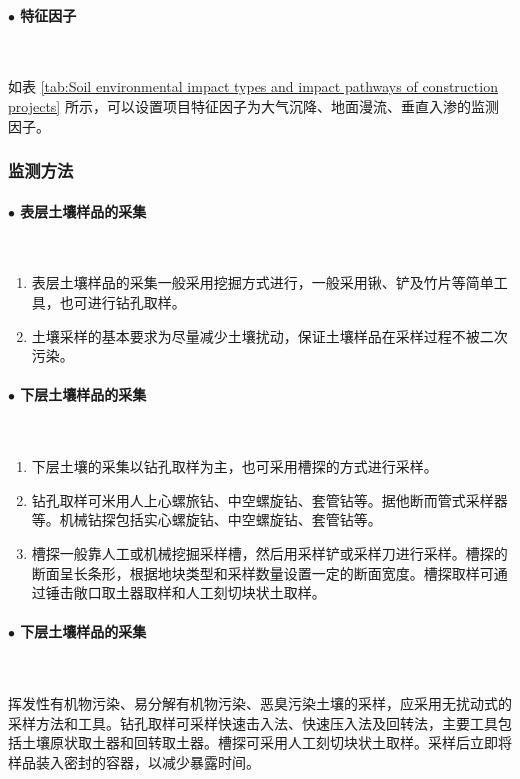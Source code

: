 \paragraph{$\bullet $ 特征因子}~{}\par
如表 \ref{tab:Soil environmental impact types and impact pathways of construction projects} 所示，可以设置项目特征因子为大气沉降、地面漫流、垂直入渗的监测因子。



\subsubsection[监测方法]{监测方法\cite{HJ25.2-2019}}
\paragraph{$\bullet $ 表层土壤样品的采集}~{}\par
\begin{enumerate}
    \item 表层土壤样品的采集一般采用挖掘方式进行，一般采用锹、铲及竹片等简单工具，也可进行钻孔取样。
    \item 土壤采样的基本要求为尽量减少土壤扰动，保证土壤样品在采样过程不被二次污染。
\end{enumerate}

\paragraph{$\bullet $ 下层土壤样品的采集}~{}\par
\begin{enumerate}
    \item 下层土壤的采集以钻孔取样为主，也可采用槽探的方式进行采样。
    \item 钻孔取样可米用人上心螺旅钻、中空螺旋钻、套管钻等。据他断而管式采样器等。机械钻探包括实心螺旋钻、中空螺旋钻、套管钻等。
    \item 槽探一般靠人工或机械挖掘采样槽，然后用采样铲或采样刀进行采样。槽探的断面呈长条形，根据地块类型和采样数量设置一定的断面宽度。槽探取样可通过锤击敞口取土器取样和人工刻切块状土取样。
\end{enumerate}

\paragraph{$\bullet $ 下层土壤样品的采集}~{}\par
挥发性有机物污染、易分解有机物污染、恶臭污染土壤的采样，应采用无扰动式的采样方法和工具。钻孔取样可采样快速击入法、快速压入法及回转法，主要工具包括土壤原状取土器和回转取土器。槽探可采用人工刻切块状土取样。采样后立即将样品装入密封的容器，以减少暴露时间。

